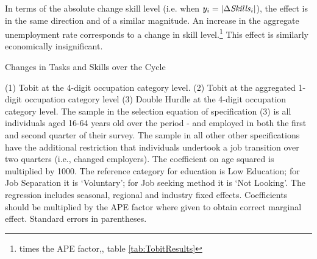 \documentclass[11pt, oneside]{article}
\begin{document}
\vspace{2mm}

In terms of the absolute change skill level (i.e. when $y_i=|\Delta\text{\textit{Skills}}_{i}|$), the effect is in the same direction and of a similar magnitude. An increase in the aggregate unemployment rate corresponds to a  change in skill level.\footnote{ times the APE factor,\hspace{-1mm}, table \ref{tab:TobitResults}} This effect is similarly economically insignificant.
\newpage
{}
\thispagestyle{empty}
\begin{table}[htbp]
	\centering
	\caption{Changes in Tasks and Skills over the Cycle}\label{tab:TobitResults}
	\begin{adjustbox}{width=\textwidth}
		\begin{threeparttable}
			
			
			\begin{tablenotes}
				\item{\footnotesize{(1) Tobit at the 4-digit occupation category level. (2) Tobit at the aggregated 1-digit occupation category level (3) Double Hurdle at the 4-digit occupation category level. The sample in the selection equation of specification (3) is all individuals aged 16-64 years old over the period \hspace{-1mm}-\hspace{-1mm} and employed in both the first and second quarter of their survey. The sample in all other other specifications have the additional restriction that individuals undertook a job transition over two quarters (i.e., changed employers). The coefficient on age squared is multiplied by 1000. The reference category for education is Low Education; for Job Separation it is `Voluntary';  for Job seeking method it is `Not Looking'. The regression includes seasonal, regional and industry fixed effects. Coefficients should be  multiplied by the APE factor where given to obtain correct marginal effect. Standard errors in parentheses.}}
			\end{tablenotes}
		\end{threeparttable}
	\end{adjustbox}
\end{table}
\restoregeometry %
\newpage
\vspace{2mm}
\end{document}
